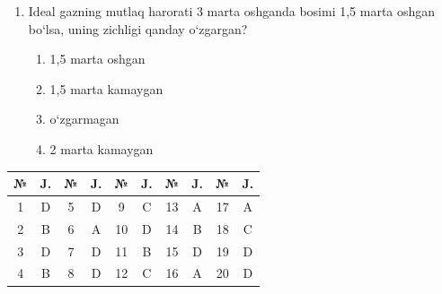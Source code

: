 \begin{enumerate}
\item Ideal gazning mutlaq harorati 3 marta oshganda bosimi 1,5 marta oshgan bo‘lsa, uning zichligi qanday o‘zgargan?
\begin{enumerate}[label=\Alph*)]
\item 1,5 marta oshgan
\item 1,5 marta kamaygan
\item o‘zgarmagan
\item 2 marta kamaygan
\end{enumerate}

\end{enumerate}



\begin{table}[h!]
\centering
\begin{tabular}{|c|c|c|c|c|c|c|c|c|c|}
\hline
№ & J. & № & J. & № & J. & № & J. & № & J. \\ \hline
1 & D & 5 & D & 9 & C & 13 & A & 17 & A \\ \hline
2 & B & 6 & A & 10 & D & 14 & B & 18 & C \\ \hline
3 & D & 7 & D & 11 & B & 15 & D & 19 & D \\ \hline
4 & B & 8 & D & 12 & C & 16 & A & 20 & D \\ \hline
\end{tabular}
\end{table}